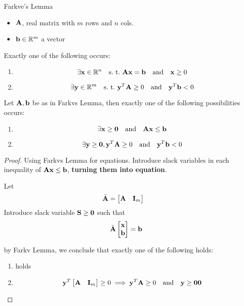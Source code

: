 \begin{lem}{Farkve's Lemma}
    \begin{itemize}
        \item $\mathbf{A}$, real matrix with $m$ rows and $n$ cols.
        \item $\mathbf{b}\in \mathbb{R}^m$ a vector
    \end{itemize}
    Exactly one of the following occurs:
    \begin{enumerate}
        \item \[\exists \mathbf{x} \in \mathbb{R}^n \quad \text{s.\ t.\ } \mathbf{A}\mathbf{x} = \mathbf{b}
            \quad \text{and} \quad \mathbf{x} \geq 0\]
        \item \[\exists \mathbf{y} \in \mathbb{R}^m \quad \text{s.\ t.\ } 
                \mathbf{y}^T \mathbf{A} \geq 0 \quad \text{and} \quad \mathbf{y}^T \mathbf{b} < 0
            \]
    \end{enumerate}
\end{lem}

\begin{thm}
    Let $\mathbf{A}, \mathbf{b}$ be as in Farkvs Lemma, then exactly one of the
    following possibilities occurs:
    \begin{enumerate}
        \item 
            \[
                \exists \mathbf{x}\geq \mathbf{0} \quad \text{and} \quad \mathbf{A}\mathbf{x} \leq \mathbf{b}
            \]
        \item \[
                \exists \mathbf{y} \geq \mathbf{0}, \mathbf{y}^T\mathbf{A} \geq 0 \quad
                \text{and}\quad \mathbf{y}^T \mathbf{b} < 0
            \]
    \end{enumerate}
\end{thm}
\begin{proof}
    Using Farkvs Lemma for equations. Introduce slack variables in each
    inequality of $\mathbf{A}\mathbf{x} \leq \mathbf{b}$, \textbf{turning them into equation}.

    Let 
    \[\bar{\mathbf{A}} =  \begin{bmatrix}
            \mathbf{A} & \mathbf{I}_m 
        \end{bmatrix}
        \quad
    \]
    Introduce slack variable $\mathbf{S} \geq \mathbf{0}$ such that
    \[ \bar{\mathbf{A}} \begin{bmatrix} \mathbf{x} \\\mathbf{b}\end{bmatrix} = \mathbf{b}\]

    by Farkv Lemma, we conclude that exactly one of the following holds:
    \begin{enumerate}
        \item holds
        \item \[\mathbf{y}^T \begin{bmatrix} \mathbf{A} & \mathbf{I}_m\end{bmatrix} \geq 0
            \implies \mathbf{y}^T \mathbf{A} \geq 0 \quad \text{and}\quad \mathbf{y} \geq
        \mathbf{0}\mathbf{0} \]
    \end{enumerate}
\end{proof}


